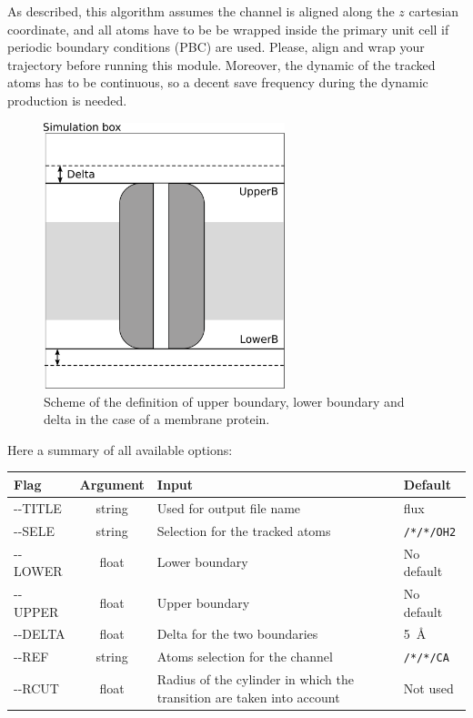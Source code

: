 \documentclass[11pt,twoside,onecolumn,a4paper,openright,notitlepage]{book}[2001/04/21]
\begin{document}
As described, this algorithm assumes the channel is aligned along the $z$ cartesian coordinate, and all atoms have to be be wrapped inside the primary unit cell if periodic boundary conditions (PBC) are used. Please, align and wrap your trajectory before running this module. Moreover, the dynamic of the tracked atoms has to be continuous, so a decent save frequency during the dynamic production is needed. 

\begin{figure}[hb]
  \centering
  \includegraphics[width=7.0cm]{images/flux-scheme.pdf}
  \caption{Scheme of the definition of upper boundary, lower boundary and delta in the case of a membrane protein.}
  \label{fig:flux-scheme}
\end{figure}

\clearpage
Here a summary of all available options:
\begin{longtable}{l|c|p{6.0cm}|l}
\bf{Flag} & \bf{Argument} & \bf{Input} & \bf{Default}\\
\hline\endhead
-{}-TITLE    & string              & Used for output file name                       & flux \\
-{}-SELE     & string              & Selection for the tracked atoms                 & \verb#/*/*/OH2# \\
-{}-LOWER    & float               & Lower boundary                                  & No default\\ 
-{}-UPPER    & float               & Upper boundary                                  & No default\\ 
-{}-DELTA    & float               & Delta for the two boundaries                    & 5~\AA \\
-{}-REF      & string              & Atoms selection for the channel                 & \verb#/*/*/CA# \\
-{}-RCUT     & float               & Radius of the cylinder in which the transition are taken into account & Not used \\
\end{longtable}
\end{document}
